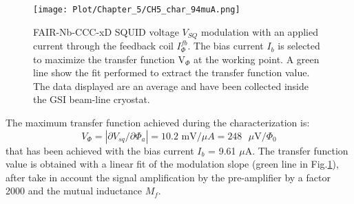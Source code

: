 \documentclass[12pt,a4paper]{report}
\begin{document}
        \begin{figure}[H]
        	\centering
        	\texttt{[image: Plot/Chapter\_5/CH5\_char\_94muA.png]}
        	\caption{\small{FAIR-Nb-CCC-xD SQUID voltage $V_{SQ}$ modulation with an applied current through the feedback coil $I_\Phi^{fb}$. The bias current $I_b$ is selected to maximize the transfer function V$_\Phi$ at the working point. A green line show the fit performed to extract the transfer function value. The data displayed are an average and have been collected inside the GSI beam-line cryostat.}}
        	\label{CH5_char_muA}
        \end{figure}
        The maximum transfer function achieved during the characterization is:
        \begin{equation}
       	 V_\Phi = |\partial V_{sq}/\partial\Phi_a| = 10.2\text{ mV}/\mu A = 248 \text{ $\mu$V}/\Phi_0
        \end{equation}
        that has been achieved with the bias current $I_b$ = 9.61 $\mu$A. The transfer function value is obtained with a linear fit of the modulation slope (green line in Fig.\ref{CH5_char_muA}), after take in account the signal amplification by the pre-amplifier by a factor 2000 and the mutual inductance $M_f$.
       
\end{document}

